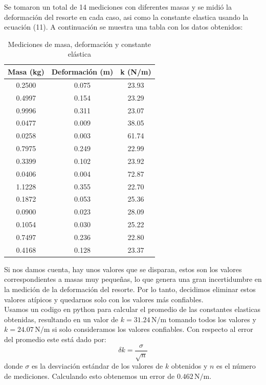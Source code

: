 \documentclass{article}
\begin{document}
Se tomaron un total de 14 mediciones con diferentes masas y se midió la
deformación del resorte en cada caso, asi como la constante elastica usando
la ecuación (11). A continuación se muestra una tabla con los datos 
obtenidos:

\begin{table}[H]
\centering
\begin{tabular}{|c|c|c|}
\hline
Masa (kg) & Deformación (m) & k (N/m) \\
\hline
0.2500 & 0.075 & 23.93 \\
\hline
0.4997 & 0.154 & 23.29 \\
\hline
0.9996 & 0.311 & 23.07 \\
\hline
0.0477 & 0.009 & 38.05 \\
\hline
0.0258 & 0.003 & 61.74 \\
\hline
0.7975 & 0.249 & 22.99 \\
\hline
0.3399 & 0.102 & 23.92 \\
\hline
0.0406 & 0.004 & 72.87 \\
\hline
1.1228 & 0.355 & 22.70 \\
\hline
0.1872 & 0.053 & 25.36 \\
\hline
0.0900 & 0.023 & 28.09 \\
\hline
0.1054 & 0.030 & 25.22 \\
\hline
0.7497 & 0.236 & 22.80 \\
\hline
0.4168 & 0.128 & 23.37 \\
\hline
\end{tabular}
\caption{Mediciones de masa, deformación y constante elástica}
\label{tab:mediciones-resorte}
\end{table}

Si nos damos cuenta, hay unos valores que se disparan, estos son los
valores correspondientes a masas muy pequeñas, lo que genera una gran
incertidumbre en la medición de la deformación del resorte. Por lo tanto,
decidimos eliminar estos valores atípicos y quedarnos solo con los valores
más confiables. \\

Usamos un codigo en python para calcular el promedio de las constantes 
elasticas obtenidas, resultando en un valor de $k = 31.24 \, \text{N/m}$
tomando todos los valores y $k = 24.07 \, \text{N/m}$ si solo consideramos
los valores confiables. Con respecto al error del promedio este está dado
por:
\begin{equation}
   \delta k = \dfrac{\sigma}{\sqrt{n}}
\end{equation}
donde $\sigma$ es la desviación estándar de los valores de $k$ obtenidos
y $n$ es el número de mediciones. Calculando esto obtenemos un error de
$0.462 \, \text{N/m}$. \\
\end{document}
